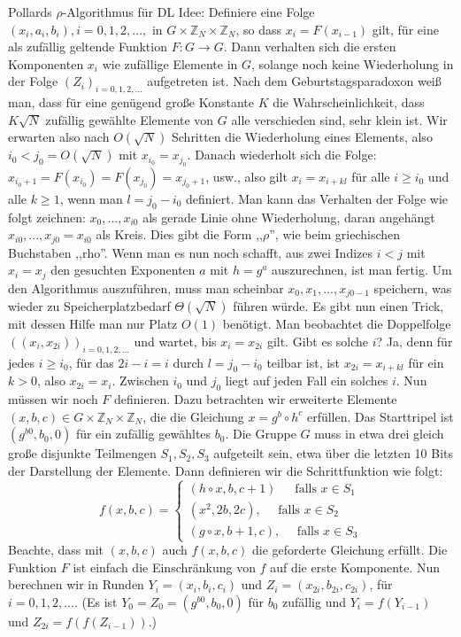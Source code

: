 \documentclass[a4paper]{article}
\begin{document}
\begin{multicols}{3}
{{{{Pollards $ρ$-Algorithmus für DL 
Idee: Definiere eine Folge $(x_i,a_i,b_i),i= 0,1,2,...,$ in $G\times\mathbb{Z}_N\times\mathbb{Z}_N$, so dass $x_i=F(x_{i-1})$ gilt, für eine als zufällig geltende Funktion $F:G\rightarrow G$. Dann verhalten sich die ersten Komponenten $x_i$ wie zufällige Elemente in $G$, solange noch keine Wiederholung in der Folge $(Z_i)_{i=0, 1 , 2 ,...}$ aufgetreten ist. Nach dem Geburtstagsparadoxon weiß man, dass für eine genügend große Konstante $K$ die Wahrscheinlichkeit, dass $K\sqrt{N}$ zufällig gewählte Elemente von $G$ alle verschieden sind, sehr klein ist. Wir erwarten also nach $O(\sqrt{N})$ Schritten die Wiederholung eines Elements, also $i_0< j_0=O(\sqrt{N})$ mit $x_{i_0}= x_{j_0}$. Danach wiederholt sich die Folge: $x_{i_0 +1}= F(x_{i_0}) =F(x_{j_0}) = x_{j_0 +1}$, usw., also gilt $x_i=x_{i+kl}$ für alle $i\geq i_0$ und alle $k\geq 1$, wenn man $l=j_0 -i_0$ definiert. Man kann das Verhalten der Folge wie folgt zeichnen: $x_0,...,x_{i0}$ als gerade Linie ohne Wiederholung, daran angehängt $x_{i0},...,x_{j0}=x_{i0}$ als Kreis. Dies gibt die Form ,,$ρ$'', wie beim griechischen Buchstaben ,,rho''. Wenn man es nun noch schafft, aus zwei Indizes $i < j$ mit $x_i=x_j$ den gesuchten Exponenten $a$ mit $h=g^a$ auszurechnen, ist man fertig.
Um den Algorithmus auszuführen, muss man scheinbar $x_0,x_1,...,x_{j0-1}$ speichern, was wieder zu Speicherplatzbedarf $Θ(\sqrt{N})$ führen würde. Es gibt nun einen Trick, mit dessen Hilfe man nur Platz $O(1)$ benötigt. Man beobachtet die Doppelfolge $((x_i,x_{2i}))_{i=0, 1 , 2 ,...}$ und wartet, bis $x_i= x_{2i}$ gilt. Gibt es solche $i$? Ja, denn für jedes $i\geq i_0$, für das $2i-i=i$ durch $l=j_0-i_0$ teilbar ist, ist $x_{2i}=x_{i+kl}$ für ein $k>0$, also $x_{2i}=x_i$. Zwischen $i_0$ und $j_0$ liegt auf jeden Fall ein solches $i$. Nun müssen wir noch $F$ definieren. Dazu betrachten wir erweiterte Elemente $(x,b,c)\in G\times\mathbb{Z}_N \times\mathbb{Z}_N$, die die Gleichung $x=g^b \circ h^c$ erfüllen. Das Starttripel ist $(g^{b0},b_0,0)$ für ein zufällig gewähltes $b_0$. Die Gruppe $G$ muss in etwa drei gleich große disjunkte Teilmengen $S_1,S_2,S_3$ aufgeteilt sein, etwa über die letzten 10 Bits der Darstellung der Elemente. Dann definieren wir die Schrittfunktion wie folgt:
$$f(x,b,c) =\begin{cases} (h\circ x,b,c+1)\,\quad\text{ falls }x\in S_1\\ (x^2, 2b, 2c),\quad\text{ falls }x\in S_2\\ (g\circ x,b+1,c),\quad\text{ falls } x\in S_3 \end{cases}$$
Beachte, dass mit $(x,b,c)$ auch $f(x,b,c)$ die geforderte Gleichung erfüllt. Die Funktion $F$ ist einfach die Einschränkung von $f$ auf die erste Komponente.
Nun berechnen wir in Runden $Y_i= (x_i,b_i,c_i)$ und $Z_i= (x_{2i},b_{2i},c_{2i})$, für $i=0,1,2,....$ (Es ist $Y_0=Z_0=(g^{b0},b_0,0)$ für $b_0$ zufällig und $Y_i=f(Y_{i-1})$ und $Z_{2i}=f(f(Z_{i-1}))$.)

}}}}
\end{multicols}
\end{document}
